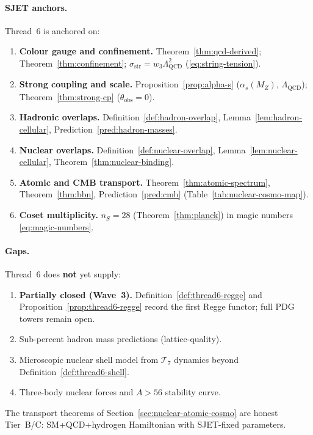 \paragraph{SJET anchors.}
Thread~6 is anchored on:
\begin{enumerate}[label=(\roman*),leftmargin=*]
  \item \textbf{Colour gauge and confinement.}
    Theorem~\ref{thm:qcd-derived}; Theorem~\ref{thm:confinement};
    $\sigma_{\mathrm{str}}=w_3\Lambda_{\mathrm{QCD}}^2$
    (\eqref{eq:string-tension}).
  \item \textbf{Strong coupling and scale.}
    Proposition~\ref{prop:alpha-s} ($\alpha_s(M_Z)$, $\Lambda_{\mathrm{QCD}}$);
    Theorem~\ref{thm:strong-cp} ($\theta_{\mathrm{obs}}=0$).
  \item \textbf{Hadronic overlaps.}
    Definition~\ref{def:hadron-overlap}, Lemma~\ref{lem:hadron-cellular},
    Prediction~\ref{pred:hadron-masses}.
  \item \textbf{Nuclear overlaps.}
    Definition~\ref{def:nuclear-overlap}, Lemma~\ref{lem:nuclear-cellular},
    Theorem~\ref{thm:nuclear-binding}.
  \item \textbf{Atomic and CMB transport.}
    Theorem~\ref{thm:atomic-spectrum}, Theorem~\ref{thm:bbn},
    Prediction~\ref{pred:cmb} (Table~\ref{tab:nuclear-cosmo-map}).
  \item \textbf{Coset multiplicity.}
    $n_S=28$ (Theorem~\ref{thm:planck}) in magic numbers
    \eqref{eq:magic-numbers}.
\end{enumerate}

\paragraph{Gaps.}
Thread~6 does \textbf{not} yet supply:
\begin{enumerate}[label=(\roman*),leftmargin=*]
  \item \textbf{Partially closed (Wave~3).}
    Definition~\ref{def:thread6-regge} and
    Proposition~\ref{prop:thread6-regge} record the first Regge functor;
    full PDG towers remain open.
  \item Sub-percent hadron mass predictions (lattice-quality).
  \item Microscopic nuclear shell model from $\mathcal{T}_7$ dynamics beyond
    Definition~\ref{def:thread6-shell}.
  \item Three-body nuclear forces and $A>56$ stability curve.
\end{enumerate}
The transport theorems of Section~\ref{sec:nuclear-atomic-cosmo} are honest
Tier~B/C: SM+QCD+hydrogen Hamiltonian with SJET-fixed parameters.

